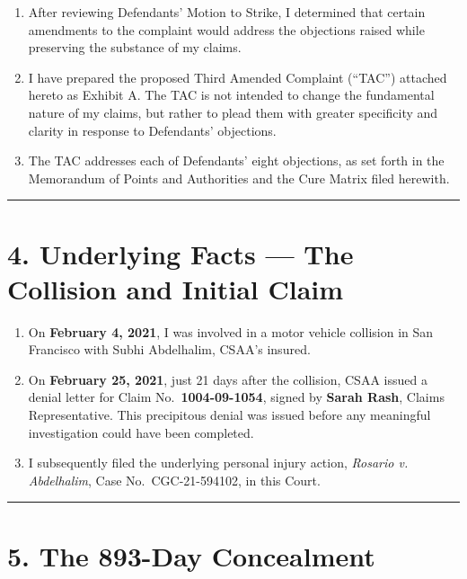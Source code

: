 \begin{enumerate}
\def\labelenumi{\arabic{enumi}.}
\setcounter{enumi}{4}
\item
  After reviewing Defendants' Motion to Strike, I determined that certain amendments to the complaint would address the objections raised while preserving the substance of my claims.
\item
  I have prepared the proposed Third Amended Complaint (``TAC'') attached hereto as Exhibit A. The TAC is not intended to change the fundamental nature of my claims, but rather to plead them with greater specificity and clarity in response to Defendants' objections.
\item
  The TAC addresses each of Defendants' eight objections, as set forth in the Memorandum of Points and Authorities and the Cure Matrix filed herewith.
\end{enumerate}

\begin{center}\rule{0.5\linewidth}{0.5pt}\end{center}

\section{4. Underlying Facts --- The Collision and Initial Claim}\label{underlying-facts-the-collision-and-initial-claim}

\begin{enumerate}
\def\labelenumi{\arabic{enumi}.}
\setcounter{enumi}{7}
\item
  On \textbf{February 4, 2021}, I was involved in a motor vehicle collision in San Francisco with Subhi Abdelhalim, CSAA's insured.
\item
  On \textbf{February 25, 2021}, just 21 days after the collision, CSAA issued a denial letter for Claim No.~\textbf{1004-09-1054}, signed by \textbf{Sarah Rash}, Claims Representative. This precipitous denial was issued before any meaningful investigation could have been completed.
\item
  I subsequently filed the underlying personal injury action, \emph{Rosario v. Abdelhalim}, Case No.~CGC-21-594102, in this Court.
\end{enumerate}

\begin{center}\rule{0.5\linewidth}{0.5pt}\end{center}

\section{5. The 893-Day Concealment}\label{the-893-day-concealment}

